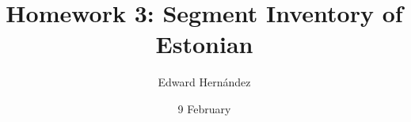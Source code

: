 \documentclass[doc]{apa6}
\begin{document}
\title{Homework 3: Segment Inventory of Estonian}
\author{Edward Hern\'{a}ndez}
\date{9 February}
\maketitle

\end{document}
